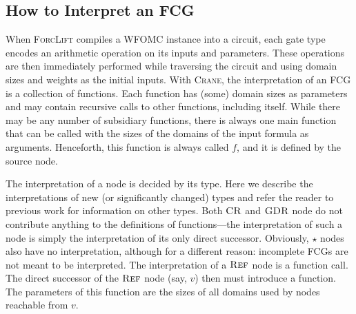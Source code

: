 \subsection{How to Interpret an FCG}

When \textsc{ForcLift} \citep{DBLP:conf/ijcai/BroeckTMDR11} compiles a WFOMC
instance into a circuit, each gate type encodes an arithmetic operation on its
inputs and parameters. These operations are then immediately performed while
traversing the circuit and using domain sizes and weights as the initial inputs.
With \textsc{Crane}, the interpretation of an FCG is a collection of functions.
Each function has (some) domain sizes as parameters and may contain recursive
calls to other functions, including itself. While there may be any number of
subsidiary functions, there is always one main function that can be called with
the sizes of the domains of the input formula as arguments. Henceforth, this
function is always called $f$, and it is defined by the source node.

The interpretation of a node is decided by its type. Here we describe the
interpretations of new (or significantly changed) types and refer the reader to
previous work \citep{DBLP:conf/ijcai/BroeckTMDR11} for information on other
types. Both $\operatorname{\textsc{CR}}$ and $\operatorname{\textsc{GDR}}$ node do not contribute anything to the definitions
of functions---the interpretation of such a node is simply the interpretation of
its only direct successor. Obviously, $\star$ nodes also have no interpretation,
although for a different reason: incomplete FCGs are not meant to be
interpreted. The interpretation of a $\operatorname{\textsc{Ref}}$ node is a function call. The direct
successor of the $\operatorname{\textsc{Ref}}$ node (say, $v$) then must introduce a function. The
parameters of this function are the sizes of all domains used by nodes reachable
from $v$.


